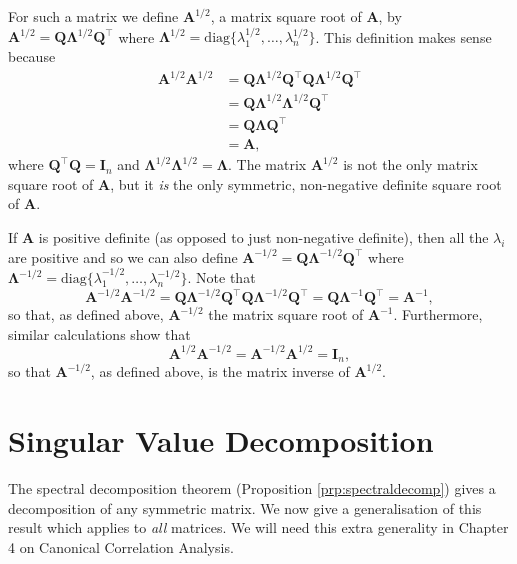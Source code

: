 \documentclass[]{book}
\theoremstyle{definition}
\theoremstyle{definition}
\theoremstyle{definition}
\theoremstyle{remark}
\begin{document}
For such a matrix we define \({\boldsymbol A}^{1/2}\), a matrix square root of \(\boldsymbol A\), by \({\boldsymbol A}^{1/2}=\boldsymbol Q\boldsymbol \Lambda^{1/2} \boldsymbol Q^\top\) where \(\boldsymbol \Lambda^{1/2}=\text{diag}\{\lambda_1^{1/2}, \ldots , \lambda_n^{1/2}\}\). This definition makes sense because
\begin{align*}
\boldsymbol A^{1/2}\boldsymbol A^{1/2}&=\boldsymbol Q\boldsymbol \Lambda^{1/2}\boldsymbol Q^\top \boldsymbol Q\boldsymbol \Lambda^{1/2} \boldsymbol Q^\top\\
&=\boldsymbol Q\boldsymbol \Lambda^{1/2}\boldsymbol \Lambda^{1/2}\boldsymbol Q^\top\\
&=\boldsymbol Q\boldsymbol \Lambda\boldsymbol Q^\top\\
&=\boldsymbol A,
\end{align*}
where \(\boldsymbol Q^\top \boldsymbol Q=\boldsymbol I_n\) and \(\boldsymbol \Lambda^{1/2}\boldsymbol \Lambda^{1/2}=\boldsymbol \Lambda\). The matrix \(\boldsymbol A^{1/2}\) is not the only matrix square root of \(\boldsymbol A\), but it \emph{is} the only symmetric, non-negative definite square root of \(\boldsymbol A\).

If \(\boldsymbol A\) is positive definite (as opposed to just non-negative definite), then all the \(\lambda_i\) are positive and so we can also define \(\boldsymbol A^{-1/2}=\boldsymbol Q\boldsymbol \Lambda^{-1/2}\boldsymbol Q^\top\) where \(\boldsymbol \Lambda^{-1/2}=\text{diag}\{\lambda_1^{-1/2},\ldots , \lambda_n^{-1/2}\}\). Note that
\[
\boldsymbol A^{-1/2}\boldsymbol A^{-1/2}=\boldsymbol Q\boldsymbol \Lambda^{-1/2}\boldsymbol Q^\top \boldsymbol Q\boldsymbol \Lambda^{-1/2}\boldsymbol Q^\top =\boldsymbol Q\boldsymbol \Lambda^{-1}\boldsymbol Q^\top=\boldsymbol A^{-1},
\]
so that, as defined above, \(\boldsymbol A^{-1/2}\) the matrix square root of \(\boldsymbol A^{-1}\). Furthermore, similar calculations show that
\[
\boldsymbol A^{1/2}\boldsymbol A^{-1/2}=\boldsymbol A^{-1/2}\boldsymbol A^{1/2}=\boldsymbol I_n,
\]
so that \(\boldsymbol A^{-1/2}\), as defined above, is the matrix inverse of \(\boldsymbol A^{1/2}\).

\hypertarget{singular-value-decomposition}{%
\section{Singular Value Decomposition}\label{singular-value-decomposition}}

The spectral decomposition theorem (Proposition \ref{prp:spectraldecomp}) gives a decomposition of any symmetric matrix. We now give a generalisation of this result which applies to \emph{all} matrices. We will need this extra generality in Chapter 4 on Canonical Correlation Analysis.
\end{document}
